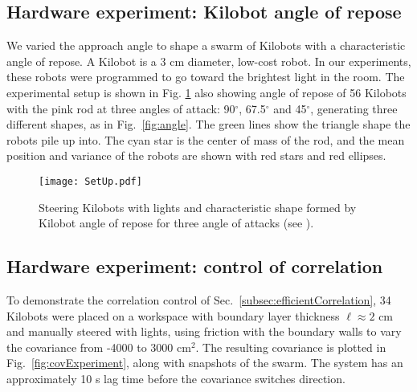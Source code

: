 \subsection{Hardware experiment: Kilobot angle of repose}
We varied the approach angle to shape a swarm of Kilobots \cite{rubenstein2014programmable} with a characteristic angle of repose. 
 A Kilobot is a 3 cm diameter,  low-cost robot. In our experiments, these robots were programmed to go toward the brightest light in the room. The experimental setup is shown in Fig. \ref{fig:SetUp} also showing angle of repose of 56 Kilobots with  the pink rod at three angles of attack: 90$^\circ$, 67.5$^\circ$ and 45$^\circ$, generating three different shapes, as in Fig.~\ref{fig:angle}. The green lines show the triangle shape the robots pile up into. The cyan star is the center of mass of the rod, and the mean position and variance of the robots are shown with red stars and red ellipses.
\begin{figure}
\begin{center}
	\texttt{[image: SetUp.pdf]}
\end{center}
\vspace{-1.5em}
\caption{\label{fig:SetUp}
Steering Kilobots with lights and characteristic shape formed by Kilobot angle of repose for three angle of attacks (see \cite{shahrokhiICRAvideo2019}).
}\vspace{-1.5em}
\end{figure}






\subsection{Hardware experiment: control of correlation}
To demonstrate the correlation control of Sec.~\ref{subsec:efficientCorrelation}, 34 Kilobots were placed on a workspace with boundary layer thickness $\ell \approx 2$ cm and manually steered with lights, using friction with the boundary walls to vary the covariance from  -4000 to 3000 cm$^2$.  The resulting covariance is plotted in Fig.~\ref{fig:covExperiment}, along with snapshots of the swarm. The system has an approximately 10 s lag time before the covariance switches direction.




